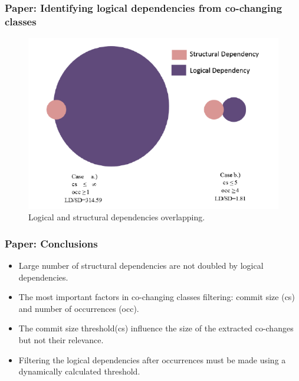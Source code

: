 \documentclass{beamer}
\begin{document}
 \begin{frame}
\frametitle{Paper: Identifying logical dependencies from co-changing classes}

\begin{center}
     \begin{figure}
	\includegraphics[width= 9.4 cm]{ld_overlapp.PNG}
	\caption{\label{fig:fig5} Logical and structural dependencies overlapping. }
     \end{figure}
\end{center}

\end{frame}


 \begin{frame}
\frametitle{Paper: Conclusions}
 \begin{itemize}
        \item  Large number of structural dependencies are not doubled by logical dependencies.
        \item  The most important factors in co-changing classes filtering: commit size (cs) and number of occurrences (occ).
        \item The commit size threshold(cs) influence the size of the extracted co-changes but not their relevance.
        \item Filtering the logical dependencies after occurrences must be made using a dynamically calculated threshold. 
    \end{itemize}
\end{frame}
\end{document}
